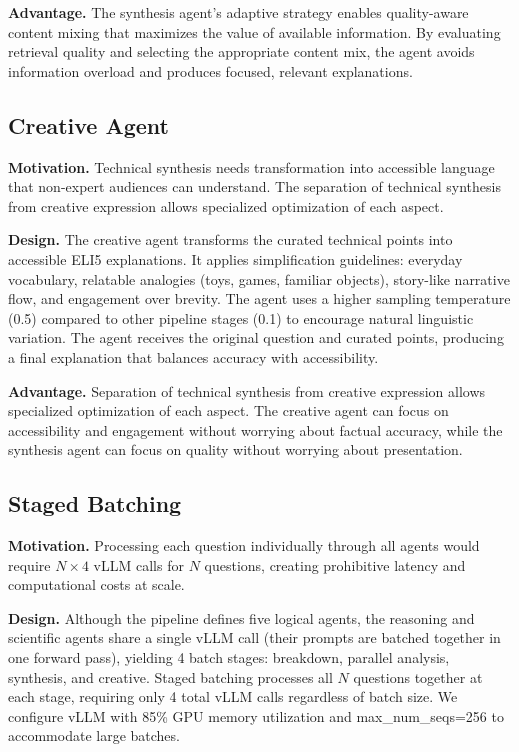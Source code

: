 \textbf{Advantage.} The synthesis agent's adaptive strategy enables quality-aware content mixing that maximizes the value of available information. By evaluating retrieval quality and selecting the appropriate content mix, the agent avoids information overload and produces focused, relevant explanations.

\subsection{Creative Agent}

\textbf{Motivation.} Technical synthesis needs transformation into accessible language that non-expert audiences can understand. The separation of technical synthesis from creative expression allows specialized optimization of each aspect.

\textbf{Design.} The creative agent transforms the curated technical points into accessible ELI5 explanations. It applies simplification guidelines: everyday vocabulary, relatable analogies (toys, games, familiar objects), story-like narrative flow, and engagement over brevity. The agent uses a higher sampling temperature (0.5) compared to other pipeline stages (0.1) to encourage natural linguistic variation. The agent receives the original question and curated points, producing a final explanation that balances accuracy with accessibility.

\textbf{Advantage.} Separation of technical synthesis from creative expression allows specialized optimization of each aspect. The creative agent can focus on accessibility and engagement without worrying about factual accuracy, while the synthesis agent can focus on quality without worrying about presentation.

\subsection{Staged Batching}

\textbf{Motivation.} Processing each question individually through all agents would require $N \times 4$ vLLM calls for $N$ questions, creating prohibitive latency and computational costs at scale.

\textbf{Design.} Although the pipeline defines five logical agents, the reasoning and scientific agents share a single vLLM call (their prompts are batched together in one forward pass), yielding 4 batch stages: breakdown, parallel analysis, synthesis, and creative. Staged batching processes all $N$ questions together at each stage, requiring only 4 total vLLM calls regardless of batch size. We configure vLLM with 85\% GPU memory utilization and max\_num\_seqs=256 to accommodate large batches.

